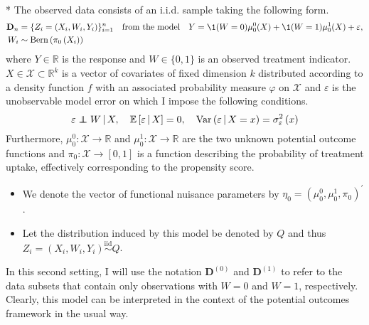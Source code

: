 \begin{boxD}
	\begin{asm}\label{asm:CATE_dgp}\mbox{}\\*
		The observed data consists of an i.i.d. sample taking the following form.
		\begin{equation}\label{DGP2}
			\begin{aligned}
				\mathbf{D}_n & = \{Z_{i} = (X_{i}, W_{i}, Y_{i})\}_{i = 1}^{n}
				\quad \text{from the model} \quad
				Y = \1(W = 0)\mu_{0}^{0}(X) + \1(W = 1)\mu_{0}^{1}(X) + \varepsilon,	\\
				W_{i} & \sim \operatorname{Bern}\left(\pi_{0}\left(X_{i}\right)\right)
			\end{aligned}
		\end{equation}
		where $Y \in \mathbb{R}$ is the response and $W \in \{0,1\}$ is an observed treatment indicator.
		$X \in \mathcal{X} \subset \mathbb{R}^k$ is a vector of covariates of fixed dimension $k$ distributed according to a density function $f$ with an associated probability measure $\varphi$ on $\mathcal{X}$ and $\varepsilon$ is the unobservable model error on which I impose the following conditions.
		\begin{equation}
			\varepsilon \perp\!\!\!\!\perp W \, | \, X, \quad
			\mathbb{E}\left[\varepsilon \, | \, X\right] = 0, \quad
			\text{Var}\left(\varepsilon \, | \, X = x\right) = \sigma_{\varepsilon}^2\left(x\right)
		\end{equation}
		Furthermore, $\mu_{0}^{0}:\mathcal{X} \rightarrow \mathbb{R}$ and $\mu_{0}^{1}:\mathcal{X} \rightarrow \mathbb{R}$ are the two unknown potential outcome functions and $\pi_{0}:\mathcal{X} \rightarrow [0,1]$ is a function describing the probability of treatment uptake, effectively corresponding to the propensity score.
        \begin{itemize}
            \item We denote the vector of functional nuisance parameters by $\eta_{0} = \left(\mu_{0}^{0}, \mu_{0}^{1}, \pi_{0}\right)^{\prime}$.
            \item Let the distribution induced by this model be denoted by $Q$ and thus $Z_{i} = \left(X_{i}, W_{i}, Y_{i}\right) \overset{\text{iid}}{\sim} Q$.
        \end{itemize}
	\end{asm}
\end{boxD}
In this second setting, I will use the notation $\mathbf{D}^{(0)}$ and $\mathbf{D}^{(1)}$ to refer to the data subsets that contain only observations with $W = 0$ and $W = 1$, respectively.
Clearly, this model can be interpreted in the context of the potential outcomes framework in the usual way.

